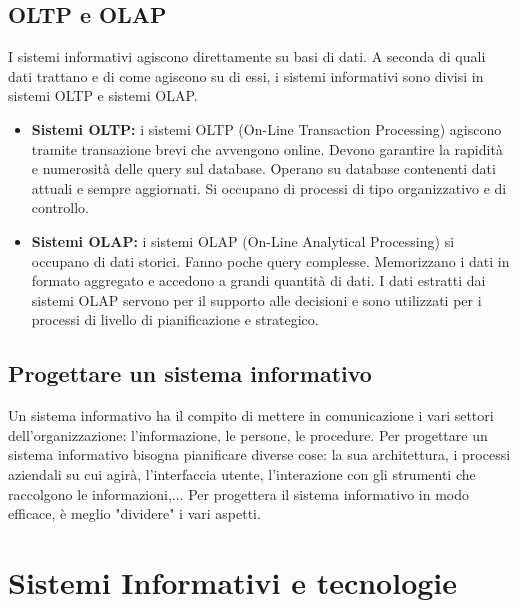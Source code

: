 \documentclass[\main/main.tex]{subfiles}
\begin{document}
\subsection{OLTP e OLAP}
I sistemi informativi agiscono direttamente su basi di dati. A seconda di quali dati trattano e di come agiscono su di essi, i sistemi informativi sono divisi in sistemi OLTP e sistemi OLAP.
\begin{itemize}
  \item \textbf{Sistemi OLTP:} i sistemi OLTP (On-Line Transaction Processing) agiscono tramite transazione brevi che avvengono online. Devono garantire la rapidità e numerosità delle query sul database. Operano su database contenenti dati attuali e sempre aggiornati. Si occupano di processi di tipo organizzativo e di controllo.
  \item \textbf{Sistemi OLAP:} i sistemi OLAP (On-Line Analytical Processing) si occupano di dati storici. Fanno poche query complesse. Memorizzano i dati in formato aggregato e accedono a grandi quantità di dati. I dati estratti dai sistemi OLAP servono per il supporto alle decisioni e sono utilizzati per i processi di livello di pianificazione e strategico.
\end{itemize}


\subsection{Progettare un sistema informativo}
Un sistema informativo ha il compito di mettere in comunicazione i vari settori dell'organizzazione: l'informazione, le persone, le procedure.
Per progettare un sistema informativo bisogna pianificare diverse cose: la sua architettura, i processi aziendali su cui agirà, l'interfaccia utente, l'interazione con gli strumenti che raccolgono le informazioni,...
Per progettera il sistema informativo in modo efficace, è meglio "dividere" i vari aspetti.


\section{Sistemi Informativi e tecnologie}
\end{document}

